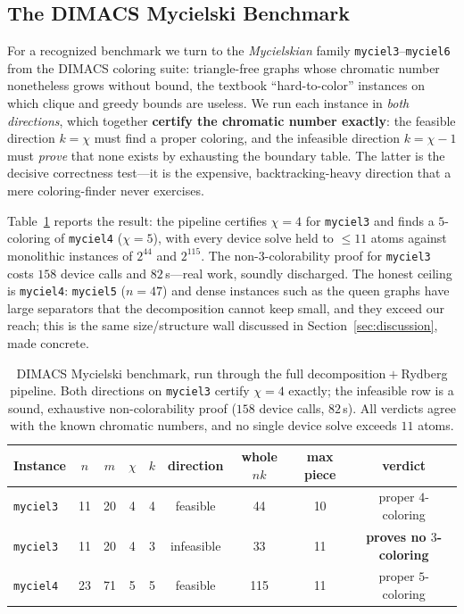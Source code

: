 \documentclass[11pt]{article}
\theoremstyle{definition}
\theoremstyle{remark}
\begin{document}
\subsection{The DIMACS Mycielski Benchmark}
\label{sec:dimacs}

For a recognized benchmark we turn to the \emph{Mycielskian} family
\texttt{myciel3}--\texttt{myciel6} from the DIMACS coloring suite: triangle-free
graphs whose chromatic number nonetheless grows without bound, the textbook
``hard-to-color'' instances on which clique and greedy bounds are useless. We run
each instance in \emph{both directions}, which together \textbf{certify the
chromatic number exactly}: the feasible direction $k=\chi$ must find a proper
coloring, and the infeasible direction $k=\chi-1$ must \emph{prove} that none
exists by exhausting the boundary table. The latter is the decisive correctness
test---it is the expensive, backtracking-heavy direction that a mere
coloring-finder never exercises.

Table~\ref{tab:dimacs} reports the result: the pipeline certifies $\chi=4$ for
\texttt{myciel3} and finds a $5$-coloring of \texttt{myciel4} ($\chi=5$), with every
device solve held to $\le 11$ atoms against monolithic instances of $2^{44}$ and
$2^{115}$. The non-$3$-colorability proof for \texttt{myciel3} costs $158$ device
calls and $82$\,s---real work, soundly discharged. The honest ceiling is
\texttt{myciel4}: \texttt{myciel5} ($n=47$) and dense instances such as the queen
graphs have large separators that the decomposition cannot keep small, and they
exceed our reach; this is the same size/structure wall discussed in
Section~\ref{sec:discussion}, made concrete.

\begin{table}[h]
\centering
\small
\begin{tabular}{@{}lcccccccc@{}}
\toprule
Instance & $n$ & $m$ & $\chi$ & $k$ & direction & whole $nk$ & max piece & verdict \\
\midrule
\texttt{myciel3} & 11 & 20 & 4 & 4 & feasible   & 44 & 10 & proper $4$-coloring \\
\texttt{myciel3} & 11 & 20 & 4 & 3 & infeasible & 33 & 11 & \textbf{proves no $3$-coloring} \\
\texttt{myciel4} & 23 & 71 & 5 & 5 & feasible   & 115& 11 & proper $5$-coloring \\
\bottomrule
\end{tabular}
\caption{DIMACS Mycielski benchmark, run through the full decomposition${}+{}$Rydberg
pipeline. Both directions on \texttt{myciel3} certify $\chi=4$ exactly; the
infeasible row is a sound, exhaustive non-colorability proof ($158$ device calls,
$82$\,s). All verdicts agree with the known chromatic numbers, and no single device
solve exceeds $11$ atoms.}
\label{tab:dimacs}
\end{table}
\end{document}
